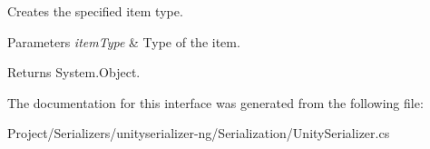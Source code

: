 Creates the specified item type. 


\begin{DoxyParams}{Parameters}
{\em item\+Type} & Type of the item.\\
\hline
\end{DoxyParams}
\begin{DoxyReturn}{Returns}
System.\+Object.
\end{DoxyReturn}


The documentation for this interface was generated from the following file\+:\begin{DoxyCompactItemize}
\item 
Project/\+Serializers/unityserializer-\/ng/\+Serialization/Unity\+Serializer.\+cs\end{DoxyCompactItemize}
